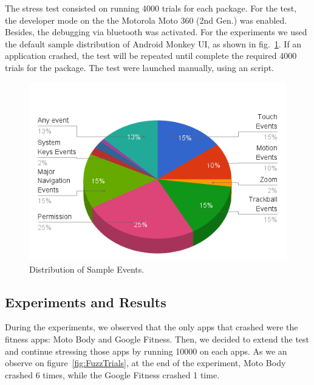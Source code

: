 \documentclass[11pt, draftclsnofoot, onecolumn]{IEEEtran}
\begin{document}
	The stress test consisted on running 4000 trials for each package. For the test, the developer mode on the the Motorola Moto 360 (2nd Gen.) was enabled. Besides, the debugging via bluetooth was activated. For the experiments we used the default sample distribution of Android Monkey UI, as shown in fig.~\ref{fig:FuzzEvents}. If an application crashed, the test will be repeated until complete the required 4000 trials for the package. The test were launched manually, using an script.
    
    \begin{figure}[h]	
        \centering
        \includegraphics[scale=0.60]{fuzz_events} 
        \caption{Distribution of Sample Events.}
        \label{fig:FuzzEvents}
    \end{figure}
	

	\subsection{Experiments and Results} %
    
    During the experiments, we observed that the only apps that crashed were the fitness apps: Moto Body and Google Fitness. Then, we decided to extend the test and continue stressing those apps by running 10000 on each apps. As we an observe on figure~\ref{fig:FuzzTrials}, at the end of the experiment, Moto Body crashed 6 times, while the Google Fitness crashed 1 time.
    
\end{document}
